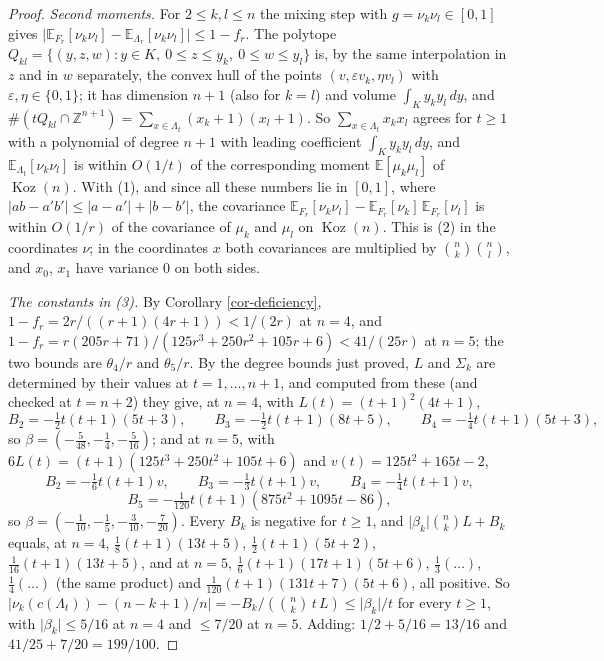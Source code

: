 \documentclass[11pt, a4paper, abstract=yes]{scrartcl}
\theoremstyle{definition}
\theoremstyle{remark}
\theoremstyle{plain}
\theoremstyle{remark}
\theoremstyle{plain}
\newcommand{\Koz}{\operatorname{Koz}}
\begin{document}
\begin{proof}
\emph{Second moments.} For \(2\le k,l\le n\) the mixing step with \(g=\nu_k\nu_l\in[0,1]\) gives
\(\lvert\mathbb E_{F_r}[\nu_k\nu_l]-\mathbb E_{\Lambda_r}[\nu_k\nu_l]\rvert\le1-f_r\). The polytope
\(Q_{kl}=\lbrace(y,z,w):y\in K,\ 0\le z\le y_k,\ 0\le w\le y_l\rbrace\) is, by the same
interpolation in \(z\) and in \(w\) separately, the convex hull of the points
\((v,\varepsilon v_k,\eta v_l)\) with \(\varepsilon,\eta\in\lbrace0,1\rbrace\); it has dimension \(n+1\)
(also for \(k=l\)) and volume \(\int_Ky_ky_l\,dy\), and
\(\#(tQ_{kl}\cap\mathbb Z^{n+1})=\sum_{x\in\Lambda_t}(x_k+1)(x_l+1)\). So
\(\sum_{x\in\Lambda_t}x_kx_l\) agrees for \(t\ge1\) with a polynomial of degree \(n+1\) with leading
coefficient \(\int_Ky_ky_l\,dy\), and \(\mathbb E_{\Lambda_t}[\nu_k\nu_l]\) is within \(O(1/t)\) of the
corresponding moment \(\mathbb E[\mu_k\mu_l]\) of \(\Koz(n)\). With (1), and since all these numbers
lie in \([0,1]\), where \(\lvert ab-a'b'\rvert\le\lvert a-a'\rvert+\lvert b-b'\rvert\), the covariance
\(\mathbb E_{F_r}[\nu_k\nu_l]-\mathbb E_{F_r}[\nu_k]\,\mathbb E_{F_r}[\nu_l]\) is within \(O(1/r)\) of the
covariance of \(\mu_k\) and \(\mu_l\) on \(\Koz(n)\). This is (2) in the coordinates \(\nu\); in the
coordinates \(x\) both covariances are multiplied by \(\binom nk\binom nl\), and \(x_0\), \(x_1\) have
variance \(0\) on both sides.

\emph{The constants in (3).} By Corollary \ref{cor-deficiency}, \(1-f_r=2r/((r+1)(4r+1))<1/(2r)\) at \(n=4\),
and \(1-f_r=r(205r+71)/(125r^3+250r^2+105r+6)<41/(25r)\) at \(n=5\); the two bounds are \(\theta_4/r\)
and \(\theta_5/r\). By the degree bounds just proved, \(L\) and \(\Sigma_k\) are determined by their values
at \(t=1,\dots,n+1\), and computed from these (and checked at \(t=n+2\)) they give, at \(n=4\),
with \(L(t)=(t+1)^2(4t+1)\),
\[
  B_2=-\tfrac12t(t+1)(5t+3),\qquad B_3=-\tfrac12t(t+1)(8t+5),\qquad B_4=-\tfrac14t(t+1)(5t+3),
\]
so \(\beta=(-\tfrac5{48},-\tfrac14,-\tfrac5{16})\); and at \(n=5\), with
\(6L(t)=(t+1)(125t^3+250t^2+105t+6)\) and \(v(t)=125t^2+165t-2\),
\[
  B_2=-\tfrac16t(t+1)v,\qquad B_3=-\tfrac13t(t+1)v,\qquad B_4=-\tfrac14t(t+1)v,
\]
\[
  B_5=-\tfrac1{120}t(t+1)(875t^2+1095t-86),
\]
so \(\beta=(-\tfrac1{10},-\tfrac15,-\tfrac3{10},-\tfrac7{20})\). Every \(B_k\) is negative for \(t\ge1\),
and \(\lvert\beta_k\rvert\binom nkL+B_k\) equals, at \(n=4\),
\(\tfrac18(t+1)(13t+5)\), \(\tfrac12(t+1)(5t+2)\), \(\tfrac1{16}(t+1)(13t+5)\), and at \(n=5\),
\(\tfrac16(t+1)(17t+1)(5t+6)\), \(\tfrac13(\dots)\), \(\tfrac14(\dots)\) (the same product) and
\(\tfrac1{120}(t+1)(131t+7)(5t+6)\), all positive. So
\(\lvert\nu_k(c(\Lambda_t))-(n-k+1)/n\rvert=-B_k/(\binom nk\,t\,L)\le\lvert\beta_k\rvert/t\) for every
\(t\ge1\), with \(\lvert\beta_k\rvert\le5/16\) at \(n=4\) and \(\le7/20\) at \(n=5\). Adding:
\(1/2+5/16=13/16\) and \(41/25+7/20=199/100\).
\end{proof}
\end{document}
